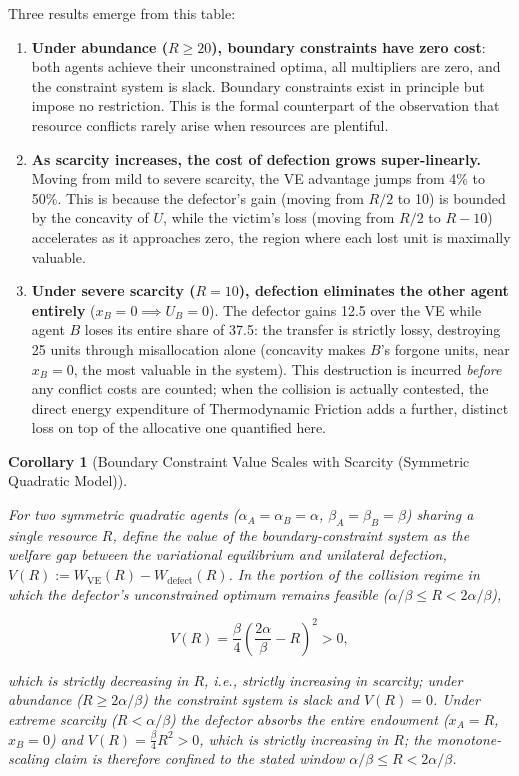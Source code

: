 \documentclass[11pt]{article}
\theoremstyle{plain}
\newtheorem{corollary}[theorem]{Corollary}
\theoremstyle{definition}
\theoremstyle{remark}
\begin{document}
Three results emerge from this table:

\begin{enumerate}
\def\labelenumi{\arabic{enumi}.}
\item
  \textbf{Under abundance (\(R \geq 20\)), boundary constraints have
  zero cost}: both agents achieve their unconstrained optima, all
  multipliers are zero, and the constraint system is slack. Boundary
  constraints exist in principle but impose no restriction. This is the
  formal counterpart of the observation that resource conflicts rarely
  arise when resources are plentiful.
\item
  \textbf{As scarcity increases, the cost of defection grows
  super-linearly.} Moving from mild to severe scarcity, the VE advantage
  jumps from 4\% to 50\%. This is because the defector's gain (moving
  from \(R/2\) to 10) is bounded by the concavity of \(U\), while the
  victim's loss (moving from \(R/2\) to \(R - 10\)) accelerates as it
  approaches zero, the region where each lost unit is maximally
  valuable.
\item
  \textbf{Under severe scarcity (\(R = 10\)), defection eliminates the
  other agent entirely} (\(x_B = 0 \implies U_B = 0\)). The defector
  gains 12.5 over the VE while agent \(B\) loses its entire share of
  37.5: the transfer is strictly lossy, destroying 25 units through
  misallocation alone (concavity makes \(B\)'s forgone units, near
  \(x_B = 0\), the most valuable in the system). This destruction is
  incurred \emph{before} any conflict costs are counted; when the
  collision is actually contested, the direct energy expenditure of
  Thermodynamic Friction \citep{TC-IV} adds a further, distinct loss on
  top of the allocative one quantified here.
\end{enumerate}

\begin{corollary}[Boundary Constraint Value Scales with Scarcity (Symmetric Quadratic Model)]
\label{cor-constraint-scarcity-scaling}

For two symmetric quadratic agents ($\alpha_A = \alpha_B = \alpha$, $\beta_A = \beta_B = \beta$) sharing a single resource $R$, define the value of the boundary-constraint system as the welfare gap between the variational equilibrium and unilateral defection, $V(R) := W_{\text{VE}}(R) - W_{\text{defect}}(R)$. In the portion of the collision regime in which the defector's unconstrained optimum remains feasible ($\alpha/\beta \leq R < 2\alpha/\beta$),

$$V(R) = \frac{\beta}{4}\left(\frac{2\alpha}{\beta} - R\right)^2 > 0,$$

which is strictly decreasing in $R$, i.e., strictly increasing in scarcity; under abundance ($R \geq 2\alpha/\beta$) the constraint system is slack and $V(R) = 0$. Under extreme scarcity ($R < \alpha/\beta$) the defector absorbs the entire endowment ($x_A = R$, $x_B = 0$) and $V(R) = \frac{\beta}{4} R^2 > 0$, which is strictly \emph{increasing} in $R$; the monotone-scaling claim is therefore confined to the stated window $\alpha/\beta \leq R < 2\alpha/\beta$.
\end{corollary}
\end{document}
